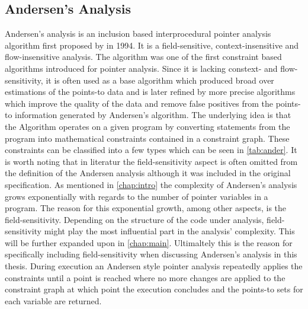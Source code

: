 \subsection{Andersen's Analysis}\label{sec:ander}
Andersen's analysis is an inclusion based interprocedural pointer analysis algorithm first proposed by \cite{andersen1994program} in 1994. It is a field-sensitive, context-insensitive and flow-insensitive analysis. 
The algorithm was one of the first constraint based algorithms introduced for pointer analysis. Since it is lacking constext- and flow-sensitivity, it is often used as a base algorithm which produced broad over estimations of the points-to data and is later refined by more precise algorithms which improve the quality of the data and remove false positives from the points-to information generated by Andersen's algorithm.
The underlying idea is that the Algorithm operates on a given program by converting statements from the program into mathematical constraints contained in a constraint graph.
These constraints can be classified into a few types which can be seen in \autoref{tab:ander}.
It is worth noting that in literatur the field-sensitivity aspect is often omitted from the definition of the Andersen analysis although it was included in the original specification.
As mentioned in \autoref{chap:intro} the complexity of Andersen's analysis grows exponentially with regards to the number of pointer variables in a program. The reason for this exponential growth, among other aspects, is the field-sensitivity. Depending on the structure of the code under analysis, field-sensitivity might play the most influential part in the analysis' complexity. This will be further expanded upon in \autoref{chap:main}. Ultimaltely this is the reason for specifically including field-sensitivity when discussing Andersen's analysis in this thesis.
During execution an Andersen style pointer analysis repeatedly applies the constraints until a point is reached where no more changes are applied to the constraint graph at which point the execution concludes and the points-to sets for each variable are returned.
